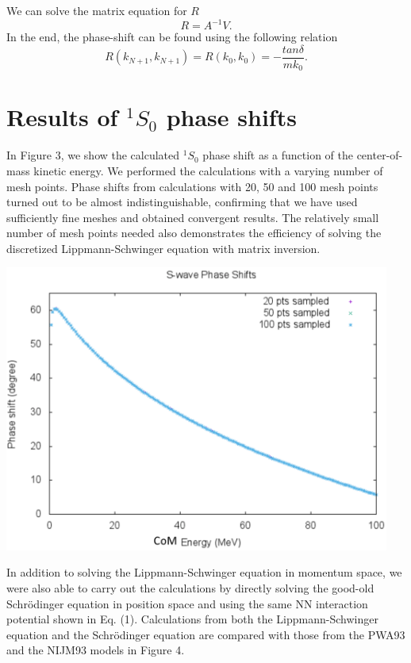 \documentclass{article}
\newenvironment{Figure}
  {\par\medskip\noindent\minipage{\linewidth}}
  {\endminipage\par\medskip}
\begin{document}
\begin{multicols}{2}
We can solve the matrix equation for $R$
\begin{equation} \label{eq:final2}
R=A^{-1}V.     
\end{equation}
In the end, the phase-shift can be found using the following relation
\begin{equation}
R(k_{N+1},k_{N+1}) = R(k_0,k_0)=-\frac{tan\delta}{mk_0}.
\end{equation}

\section{Results of $^{1}S_{0}$ phase shifts}

In Figure 3, we show the calculated $^{1}S_{0}$ phase shift as a function of the center-of-mass kinetic energy. We performed the calculations with a varying number of mesh points. Phase shifts from calculations with 20, 50 and 100 mesh points turned out to be almost indistinguishable, confirming that we have used sufficiently fine meshes and obtained convergent results. The relatively small number of mesh points needed also demonstrates the efficiency of solving the discretized Lippmann-Schwinger equation with matrix inversion.

\begin{Figure}
\centering
\includegraphics[width=0.95\textwidth]{delta_mesh.png}
\label{mesh}
\end{Figure}

In addition to solving the Lippmann-Schwinger equation in momentum space, we were also able to carry out the calculations by directly solving the good-old Schr\"{o}dinger equation in position space and using the same NN interaction potential shown in Eq. (1). Calculations from both the Lippmann-Schwinger equation and the Schr\"{o}dinger equation are compared with those from the PWA93 and the NIJM93 models in Figure 4. 


\end{multicols}
\end{document}
